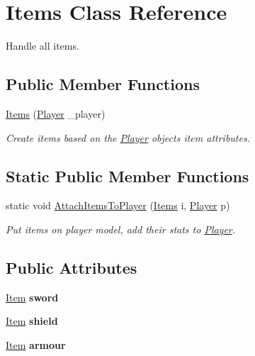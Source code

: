 \hypertarget{class_items}{}\section{Items Class Reference}
\label{class_items}


Handle all items.  


\subsection*{Public Member Functions}
\begin{DoxyCompactItemize}
\item 
\mbox{\label{class_items_a78d62b542929857f6e65b3ed91fb31ee}} 
\mbox{\hyperlink{class_items_a78d62b542929857f6e65b3ed91fb31ee}{Items}} (\mbox{\hyperlink{class_player}{Player}} \+\_\+player)
\begin{DoxyCompactList}\small\item\em Create items based on the \mbox{\hyperlink{class_player}{Player}} object\textquotesingle{}s item attributes. \end{DoxyCompactList}\end{DoxyCompactItemize}
\subsection*{Static Public Member Functions}
\begin{DoxyCompactItemize}
\item 
\mbox{\label{class_items_a0fed8123fbaa68d1d310cdb28cb1793d}} 
static void \mbox{\hyperlink{class_items_a0fed8123fbaa68d1d310cdb28cb1793d}{Attach\+Items\+To\+Player}} (\mbox{\hyperlink{class_items}{Items}} i, \mbox{\hyperlink{class_player}{Player}} p)
\begin{DoxyCompactList}\small\item\em Put items on player model, add their stats to \mbox{\hyperlink{class_player}{Player}}. \end{DoxyCompactList}\end{DoxyCompactItemize}
\subsection*{Public Attributes}
\begin{DoxyCompactItemize}
\item 
\mbox{\label{class_items_a2ee0fd7e676f594e6e184b56b7f1c958}} 
\mbox{\hyperlink{class_item}{Item}} {\bfseries sword}
\item 
\mbox{\label{class_items_a7e6e791cf22f41a685dd2092105a81b1}} 
\mbox{\hyperlink{class_item}{Item}} {\bfseries shield}
\item 
\mbox{\label{class_items_ad59621b7b465ccd957cf06dde55279dd}} 
\mbox{\hyperlink{class_item}{Item}} {\bfseries armour}
\end{DoxyCompactItemize}


